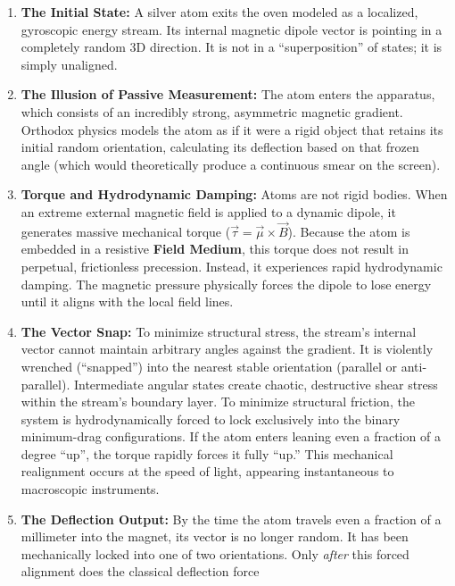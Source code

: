 \documentclass[twocolumn]{article}
\providecommand{\tightlist}{%
  \setlength{\itemsep}{0pt}\setlength{\parskip}{0pt}}
\begin{document}
\begin{enumerate}
\def\labelenumi{\arabic{enumi}.}
\tightlist
\item
  \textbf{The Initial State:} A silver atom exits the oven modeled as a
  localized, gyroscopic energy stream. Its internal magnetic dipole
  vector is pointing in a completely random 3D direction. It is not in a
  ``superposition'' of states; it is simply unaligned.
\item
  \textbf{The Illusion of Passive Measurement:} The atom enters the
  apparatus, which consists of an incredibly strong, asymmetric magnetic
  gradient. Orthodox physics models the atom as if it were a rigid
  object that retains its initial random orientation, calculating its
  deflection based on that frozen angle (which would theoretically
  produce a continuous smear on the screen).
\item
  \textbf{Torque and Hydrodynamic Damping:} Atoms are not rigid bodies.
  When an extreme external magnetic field is applied to a dynamic
  dipole, it generates massive mechanical torque
  (\(\vec{\tau} = \vec{\mu} \times \vec{B}\)). Because the atom is
  embedded in a resistive \textbf{Field Medium}, this torque does not
  result in perpetual, frictionless precession. Instead, it experiences
  rapid hydrodynamic damping. The magnetic pressure physically forces
  the dipole to lose energy until it aligns with the local field lines.
\item
  \textbf{The Vector Snap:} To minimize structural stress, the stream's
  internal vector cannot maintain arbitrary angles against the gradient.
  It is violently wrenched (``snapped'') into the nearest stable
  orientation (parallel or anti-parallel). Intermediate angular states
  create chaotic, destructive shear stress within the stream's boundary
  layer. To minimize structural friction, the system is hydrodynamically
  forced to lock exclusively into the binary minimum-drag
  configurations. If the atom enters leaning even a fraction of a degree
  ``up'', the torque rapidly forces it fully ``up.'' This mechanical
  realignment occurs at the speed of light, appearing instantaneous to
  macroscopic instruments.
\item
  \textbf{The Deflection Output:} By the time the atom travels even a
  fraction of a millimeter into the magnet, its vector is no longer
  random. It has been mechanically locked into one of two orientations.
  Only \emph{after} this forced alignment does the classical deflection
  force
\end{enumerate}
\end{document}
